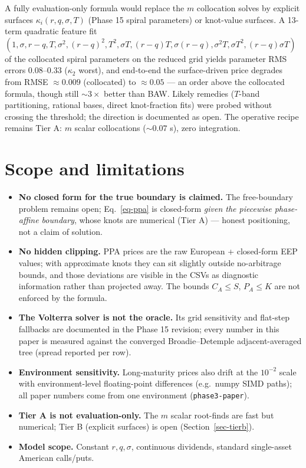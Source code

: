 \documentclass[
  english,
  10pt,
  letterpaper,
  DIV=11,
  numbers=noendperiod]{scrartcl}
\providecommand{\tightlist}{%
  \setlength{\itemsep}{0pt}\setlength{\parskip}{0pt}}
\begin{document}
A fully evaluation-only formula would replace the \(m\) collocation
solves by explicit surfaces \(\kappa_i(r,q,\sigma,T)\) (Phase 15 spiral
parameters) or knot-value surfaces. A 13-term quadratic feature fit
\((1,\sigma,r-q,T,\sigma^2,(r-q)^2,T^2,\sigma T,(r-q)T,\sigma(r-q),
\sigma^2 T,\sigma T^2,(r-q)\sigma T)\) of the collocated spiral
parameters on the reduced grid yields parameter RMS errors
\(0.08\)--\(0.33\) (\(\kappa_2\) worst), and end-to-end the
surface-driven price degrades from RMSE \(\approx0.009\) (collocated) to
\(\approx0.05\) --- an order above the collocated formula, though still
\(\sim3\times\) better than BAW. Likely remedies (\(T\)-band
partitioning, rational bases, direct knot-fraction fits) were probed
without crossing the threshold; the direction is documented as open. The
operative recipe remains Tier A: \(m\) scalar collocations (\(\sim0.07\)
s), zero integration.

\section{Scope and limitations}\label{sec-scope}

\begin{itemize}
\tightlist
\item
  \textbf{No closed form for the true boundary is claimed.} The
  free-boundary problem remains open; Eq.~\ref{eq-ppa} is closed-form
  \emph{given the piecewise phase-affine boundary}, whose knots are
  numerical (Tier A) --- honest positioning, not a claim of solution.
\item
  \textbf{No hidden clipping.} PPA prices are the raw European +
  closed-form EEP values; with approximate knots they can sit slightly
  outside no-arbitrage bounds, and those deviations are visible in the
  CSVs as diagnostic information rather than projected away. The bounds
  \(C_A\le S\), \(P_A\le K\) are not enforced by the formula.
\item
  \textbf{The Volterra solver is not the oracle.} Its grid sensitivity
  and flat-step fallbacks are documented in the Phase 15 revision; every
  number in this paper is measured against the converged
  Broadie--Detemple adjacent-averaged tree (spread reported per row).
\item
  \textbf{Environment sensitivity.} Long-maturity prices also drift at
  the \(10^{-2}\) scale with environment-level floating-point
  differences (e.g.~numpy SIMD paths); all paper numbers come from one
  environment (\texttt{phase3-paper}).
\item
  \textbf{Tier A is not evaluation-only.} The \(m\) scalar root-finds
  are fast but numerical; Tier B (explicit surfaces) is open
  (Section~\ref{sec-tierb}).
\item
  \textbf{Model scope.} Constant \(r,q,\sigma\), continuous dividends,
  standard single-asset American calls/puts.
\end{itemize}
\end{document}
